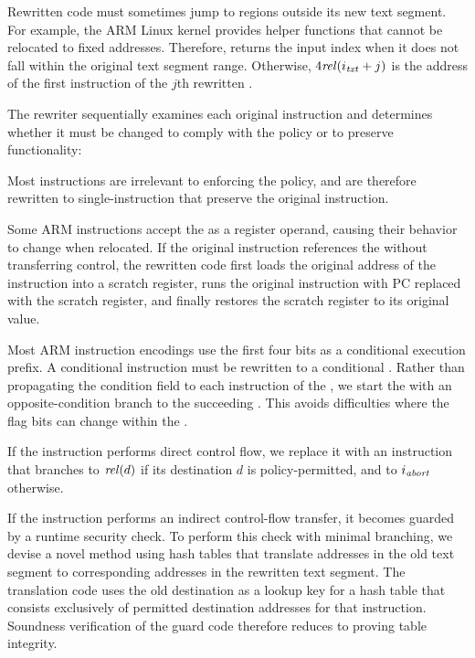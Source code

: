 Rewritten code must sometimes jump to regions outside its new text segment.
For example, the ARM Linux kernel provides helper functions that cannot be relocated to fixed addresses.
Therefore, \itoip returns the input index when it does not fall within the original text segment range.
Otherwise, $4\mathit{rel}(i_\mathit{txt}+j)$ is the address of the first instruction of the $j$th rewritten \Block.


The rewriter sequentially examines each original instruction and determines whether it must be changed
to comply with the policy or to preserve functionality:

Most instructions are irrelevant to enforcing the policy, and are therefore rewritten to single-instruction \Blocks that preserve the original instruction.

Some ARM instructions accept the \PC as a register operand, causing their behavior to change when relocated.
If the original instruction references the \PC without transferring control,
the rewritten \Block code first loads the original address of the instruction into a scratch register,
runs the original instruction with PC replaced with the scratch register,
and finally restores the scratch register to its original value.

Most ARM instruction encodings use the first four bits as a conditional execution prefix.
A conditional instruction must be rewritten to a conditional \Block.
Rather than propagating the condition field to each instruction of the \Block,
we start the \Block with an opposite-condition branch to the succeeding \Block.
This avoids difficulties where the flag bits can change within the \Block.

If the instruction performs direct control flow, we replace it with an instruction that branches to $\mathit{rel}(d)$ if its destination $d$ is policy-permitted, and to $i_\mathit{abort}$ otherwise.

If the instruction performs an indirect control-flow transfer, it becomes guarded by a runtime security check.
To perform this check with minimal branching, we devise a novel method using hash tables
that translate addresses in the old text segment to corresponding addresses in the rewritten text segment.
The translation code uses the old destination as a lookup key for a hash table that consists exclusively of permitted destination addresses for that instruction.
Soundness verification of the guard code therefore reduces to proving table integrity.

